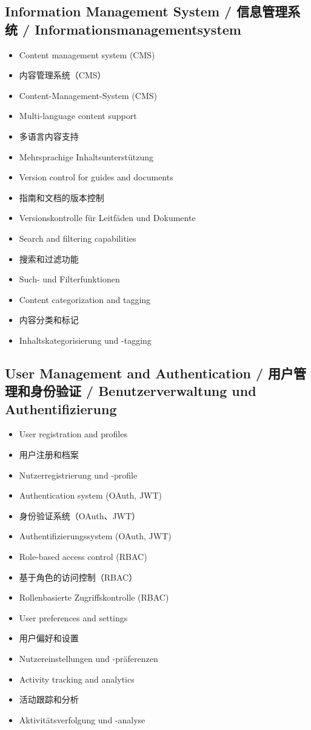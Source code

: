 \subsection{Information Management System / 信息管理系统 / Informationsmanagementsystem}
\begin{itemize}
    \item Content management system (CMS)
    \item 内容管理系统（CMS）
    \item Content-Management-System (CMS)
    \item Multi-language content support
    \item 多语言内容支持
    \item Mehrsprachige Inhaltsunterstützung
    \item Version control for guides and documents
    \item 指南和文档的版本控制
    \item Versionskontrolle für Leitfäden und Dokumente
    \item Search and filtering capabilities
    \item 搜索和过滤功能
    \item Such- und Filterfunktionen
    \item Content categorization and tagging
    \item 内容分类和标记
    \item Inhaltskategorisierung und -tagging
\end{itemize}

\subsection{User Management and Authentication / 用户管理和身份验证 / Benutzerverwaltung und Authentifizierung}
\begin{itemize}
    \item User registration and profiles
    \item 用户注册和档案
    \item Nutzerregistrierung und -profile
    \item Authentication system (OAuth, JWT)
    \item 身份验证系统（OAuth、JWT）
    \item Authentifizierungssystem (OAuth, JWT)
    \item Role-based access control (RBAC)
    \item 基于角色的访问控制（RBAC）
    \item Rollenbasierte Zugriffskontrolle (RBAC)
    \item User preferences and settings
    \item 用户偏好和设置
    \item Nutzereinstellungen und -präferenzen
    \item Activity tracking and analytics
    \item 活动跟踪和分析
    \item Aktivitätsverfolgung und -analyse
\end{itemize}

